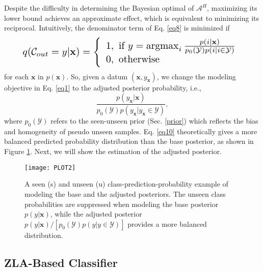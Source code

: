 \documentclass{article}
\DeclareMathOperator*{\argmax}{argmax}
\begin{document}
	Despite the difficulty in determining the Bayesian optimal of $\mathcal{A}^H$, maximizing its lower bound achieves an approximate effect, which is equivalent to minimizing its reciprocal. Intuitively, the denominator term of Eq. \ref{eq8} is minimized if
\begin{equation}
	\resizebox{0.89\linewidth}{!}{$
		\displaystyle
		q(\mathcal{C}_{out}=y|\mathbf{x})=
		\left\{
		\begin{array}{lr}
		1,~\text{if}~y=\argmax_i\frac{p(i|\mathbf{x})}{p_0(\mathcal{Y})p(i|i \in \mathcal{Y})}\\
		0,~\text{otherwise}\\
		\end{array}
		\right.
		$}
        \label{eq9}
	\end{equation}
	for each $\mathbf{x}$ in $p(\mathbf{x})$. So, given a datum $(\mathbf{x},y_\mathbf{x})$, we change the modeling objective in Eq. \ref{eq1} to the adjusted posterior probability, i.e.,
       \vspace{-0.3ex}
	\begin{equation}
\displaystyle
	\frac{p(y_\mathbf{x}|\mathbf{x})}{p_0(\mathcal{Y})p(y_\mathbf{x}|y_\mathbf{x} \in \mathcal{Y})},
\label{eq10}
	\end{equation}
where $p_0(\mathcal{Y})$ refers to the seen-unseen prior (Sec. \ref{prior}) which reflects the bias and homogeneity of pseudo unseen samples. Eq. \ref{eq10} theoretically gives a more balanced predicted probability distribution than the base posterior, as shown in Figure \ref{fig2}. Next, we will show the estimation of the adjusted posterior.
	\begin{figure}[t]
		\centering
		\subfigure
		{
			\texttt{[image: PLOT2]}
		}
		\vspace{-1.5ex}
		\caption{A seen (s) and unseen (u) class-prediction-probability example of modeling the base and the adjusted posteriors. The unseen class probabilities are suppressed when modeling the base posterior $p(y|\mathbf{x})$, while the adjusted posterior $p(y|\mathbf{x})/[p_0(\mathcal{Y})p(y|y \in \mathcal{Y})]$ provides a more balanced distribution.}
        
		\vspace{-1.6ex}
		\label{fig2}
	\end{figure}
   \vspace{-1.9ex}
	\subsection{ZLA-Based Classifier}
\end{document}
